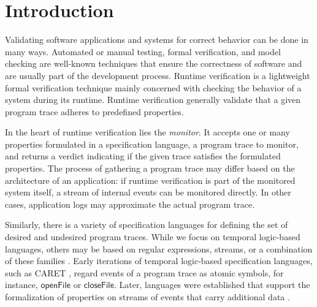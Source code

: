 \newcommand{\package}{\emph}

\chapter{Introduction}

Validating software applications and systems for correct behavior can be done in many ways. Automated or manual testing, formal verification, and model checking are well-known techniques that ensure the correctness of software and are usually part of the development process. Runtime verification is a lightweight formal verification technique mainly concerned with checking the behavior of a system during its runtime. Runtime verification generally validate that a given program trace adheres to predefined properties.

In the heart of runtime verification lies the \textit{monitor}. It accepts one or many properties formulated in a specification language, a program trace to monitor, and returns a verdict indicating if the given trace satisfies the formulated properties. The process of gathering a program trace may differ based on the architecture of an application: if runtime verification is part of the monitored system itself, a stream of internal events can be monitored directly. In other cases, application logs may approximate the actual program trace.

Similarly, there is a variety of specification languages for defining the set of desired and undesired program traces. While we focus on temporal logic-based languages, others may be based on regular expressions, streams, or a combination of these families \cite{bartocciIntroductionRuntimeVerification2018}. Early iterations of temporal logic-based specification languages, such as CARET \cite{alurTemporalLogicNested2004}, regard events of a program trace as atomic symbols, for instance, $\mathsf{openFile}$ or $\mathsf{closeFile}$. Later, languages were established that support the formalization of properties on streams of events that carry additional data \cite{havelundMonitoringEventsThat2018}.

